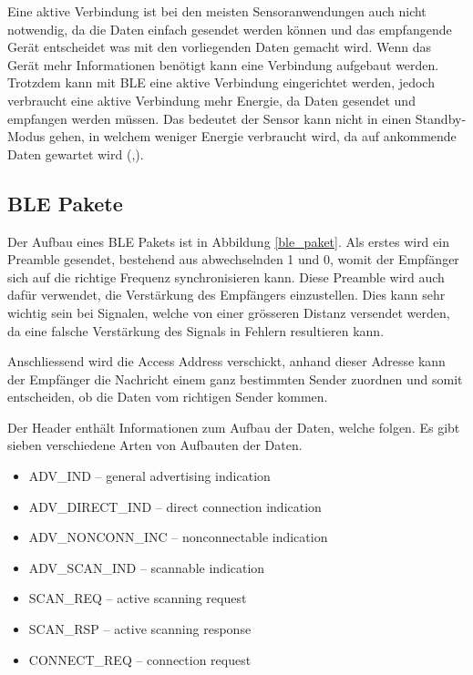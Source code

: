 Eine aktive Verbindung ist bei den meisten Sensoranwendungen auch nicht notwendig, da die Daten einfach gesendet werden können und das empfangende Gerät entscheidet was mit den vorliegenden Daten gemacht wird. Wenn das Gerät mehr Informationen benötigt kann eine Verbindung aufgebaut werden. Trotzdem kann mit BLE eine aktive Verbindung eingerichtet werden, jedoch verbraucht eine aktive Verbindung mehr Energie, da Daten gesendet und empfangen werden müssen. Das bedeutet der Sensor kann nicht in einen Standby- Modus gehen, in welchem weniger Energie verbraucht wird, da auf ankommende Daten gewartet wird (\cite{BLE_advertising},\cite{ELKO_BLE}).

\subsection{BLE Pakete}

Der Aufbau eines BLE Pakets ist in Abbildung \ref{ble_paket}. Als erstes wird ein Preamble gesendet, bestehend aus abwechselnden 1 und 0, womit der Empfänger sich auf die richtige Frequenz synchronisieren kann. Diese Preamble wird auch dafür verwendet, die Verstärkung des Empfängers einzustellen. Dies kann sehr wichtig sein bei Signalen, welche von einer grösseren Distanz versendet werden, da eine falsche Verstärkung des Signals in Fehlern resultieren kann.

Anschliessend wird die Access Address verschickt, anhand dieser Adresse kann der Empfänger die Nachricht einem ganz bestimmten Sender zuordnen und somit entscheiden, ob die Daten vom richtigen Sender kommen.

Der Header enthält Informationen zum Aufbau der Daten, welche folgen. Es gibt sieben verschiedene Arten von Aufbauten der Daten.

\begin{itemize}
    \item ADV\_IND – general advertising indication
    \item ADV\_DIRECT\_IND – direct connection indication
    \item ADV\_NONCONN\_INC – nonconnectable indication
    \item ADV\_SCAN\_IND – scannable indication
    \item SCAN\_REQ – active scanning request
    \item SCAN\_RSP – active scanning response
    \item CONNECT\_REQ – connection request
\end{itemize}

